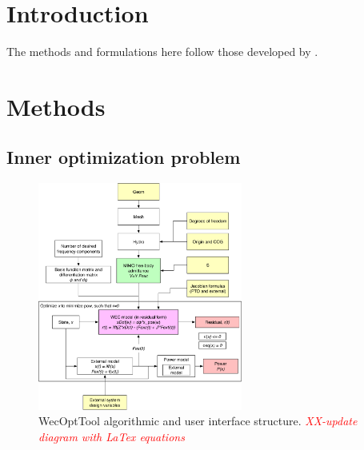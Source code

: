 \documentclass[]{article}
\newcommand{\todo}[1]{\textcolor{red}{\emph{#1}}}
\begin{document}
\author[1]{Ryan G. Coe}
\author[1]{Giorgio Bacelli}
\author[1]{Sterling S. Olson}
\author[2]{Mathew B. R. Topper}
\author[1]{Vincent S. Neary}
\author[3]{Alex Hagmuller}
\author[3]{Max Ginsburg}


\maketitle


\section{Introduction}\label{sec:intro}

The methods and formulations here follow those developed by \citet{Bacelli2014}.


\section{Methods}\label{sec:methods}

\subsection{Inner optimization problem}\label{sec:inner_optimization_problem}

\begin{figure}[tb]
	\centering
	\includegraphics[width=0.6\textwidth]{gfx/WecOptTool_structure.pdf}
	\caption{WecOptTool algorithmic and user interface structure. \todo{XX-update diagram with LaTex equations}}
	\label{fig:WecOptTool_structure}
\end{figure}
\end{document}
